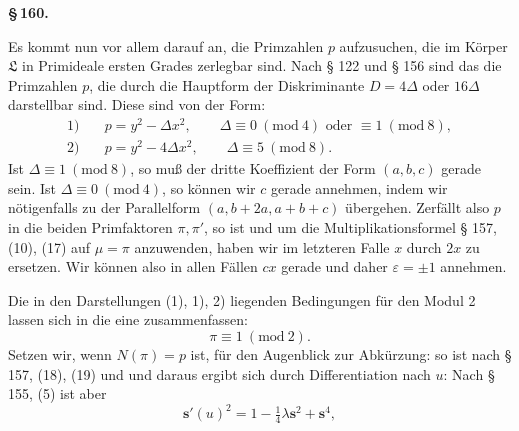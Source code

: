 \begin{center}
\textbf{\S\,160.\qquad {}}
\end{center}

Es kommt nun vor allem darauf an, die Primzahlen $p$ aufzusuchen, die im Körper $\mathfrak{L}$ in Primideale ersten Grades zerlegbar sind. Nach § 122 und § 156 sind das die Primzahlen $p$, die durch die Hauptform der Diskriminante $D = 4\Delta$ oder $16\Delta$ darstellbar sind. Diese sind von der Form:
\[
\begin{aligned}
1) \quad & p = y^2 - \Delta x^2, \qquad \Delta \equiv 0 \ (\mathrm{mod}\ 4) \text{ oder } \equiv 1 \ (\mathrm{mod}\ 8),\\
2) \quad & p = y^2 - 4\Delta x^2, \qquad \Delta \equiv 5 \ (\mathrm{mod}\ 8).
\end{aligned}
\]
Ist $\Delta \equiv 1 \ (\mathrm{mod}\ 8)$, so muß der dritte Koeffizient der Form $(a, b, c)$ gerade sein. Ist $\Delta \equiv 0 \ (\mathrm{mod}\ 4)$, so können wir $c$ gerade annehmen, indem wir nötigenfalls zu der Parallelform $(a, b+2a, a+b+c)$ übergehen. Zerfällt also $p$ in die beiden Primfaktoren $\pi, \pi'$, so ist
und um die Multiplikationsformel § 157, (10), (17) auf $\mu = \pi$ anzuwenden, haben wir im letzteren Falle $x$ durch $2x$ zu ersetzen. Wir können also in allen Fällen $cx$ gerade und daher $\varepsilon = \pm 1$ annehmen.

Die in den Darstellungen (1), 1), 2) liegenden Bedingungen für den Modul 2 lassen sich in die eine zusammenfassen:
\[
\pi \equiv 1 \ (\mathrm{mod}\ 2).
\]
Setzen wir, wenn $N(\pi) = p$ ist, für den Augenblick zur Abkürzung:
so ist nach § 157, (18), (19)
und
und daraus ergibt sich durch Differentiation nach $u$:
Nach § 155, (5) ist aber
\[
\boldsymbol{s}'(u)^2 = 1 - \tfrac{1}{4}\lambda \boldsymbol{s}^2 + \boldsymbol{s}^4,
\]
